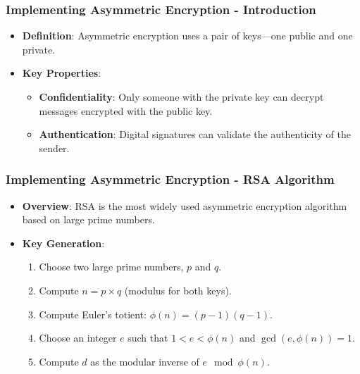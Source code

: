 \documentclass{beamer}
\begin{document}
\begin{frame}[fragile]
    \frametitle{Implementing Asymmetric Encryption - Introduction}
    \begin{itemize}
        \item \textbf{Definition}: Asymmetric encryption uses a pair of keys—one public and one private.
        \item \textbf{Key Properties}:
        \begin{itemize}
            \item \textbf{Confidentiality}: Only someone with the private key can decrypt messages encrypted with the public key.
            \item \textbf{Authentication}: Digital signatures can validate the authenticity of the sender.
        \end{itemize}
    \end{itemize}
\end{frame}

\begin{frame}[fragile]
    \frametitle{Implementing Asymmetric Encryption - RSA Algorithm}
    \begin{itemize}
        \item \textbf{Overview}: RSA is the most widely used asymmetric encryption algorithm based on large prime numbers.
        \item \textbf{Key Generation}:
        \begin{enumerate}
            \item Choose two large prime numbers, \( p \) and \( q \).
            \item Compute \( n = p \times q \) (modulus for both keys).
            \item Compute Euler's totient: \( \phi(n) = (p-1)(q-1) \).
            \item Choose an integer \( e \) such that \( 1 < e < \phi(n) \) and \( \gcd(e, \phi(n)) = 1 \).
            \item Compute \( d \) as the modular inverse of \( e \mod \phi(n) \).
        \end{enumerate}
    \end{itemize}
\end{frame}
\end{document}
